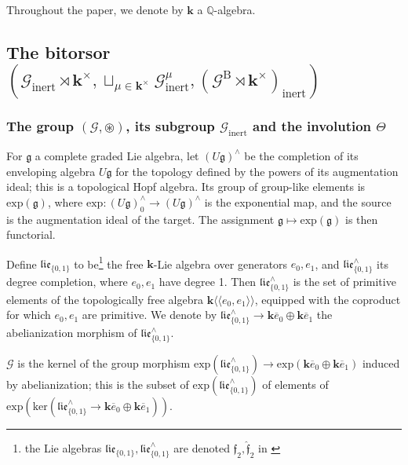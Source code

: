 \documentclass[10pt]{amsart}
\numberwithin{equation}{subsection}
\begin{document}
Throughout the paper, we denote by $\mathbf k$ a $\mathbb Q$-algebra. 

\subsection{The bitorsor $(\mathcal G_{\mathrm{inert}} \rtimes \mathbf k^\times,
\sqcup_{\mu\in\mathbf k^\times}\mathcal G_{\mathrm{inert}}^\mu,
(\mathcal G^{\mathrm B} \rtimes \mathbf k^\times)_{\mathrm{inert}})$}\label{sect:0:2}

\subsubsection{The group $(\mathcal G,\circledast)$, its subgroup 
 $\mathcal G_{\mathrm{inert}}$ and the involution $\Theta$}%

For $\mathfrak g$ a complete graded Lie algebra, let $(U\mathfrak g)^\wedge$ be 
the completion of its enveloping algebra $U\mathfrak g$ for the topology 
defined by the powers of its augmentation ideal; 
this is a topological Hopf algebra. Its group of group-like elements
is $\mathrm{exp}(\mathfrak g)$, where $\mathrm{exp} : (U\mathfrak g)^\wedge_0\to 
(U\mathfrak g)^\wedge$ is the exponential map, and the source is the augmentation ideal of 
the target. The assignment $\mathfrak g\mapsto\mathrm{exp}(\mathfrak g)$ is then functorial. 

Define $\mathfrak{lie}_{\{0,1\}}$ to be\footnote{the Lie algebras $\mathfrak{lie}_{\{0,1\}},
\mathfrak{lie}_{\{0,1\}}^\wedge$ are denoted $\mathfrak f_2,\hat{\mathfrak f}_2$ 
in \cite{EF1}} the free $\mathbf k$-Lie algebra over generators $e_0,e_1$, and 
$\mathfrak{lie}_{\{0,1\}}^\wedge$ its degree completion, where $e_0,e_1$ have 
degree 1. Then $\mathfrak{lie}_{\{0,1\}}^\wedge$ is the set of primitive elements of the 
topologically free algebra $\mathbf k\langle\langle e_0,e_1\rangle\rangle$, 
equipped with the coproduct for which $e_0,e_1$ are primitive. 
We denote by $\mathfrak{lie}_{\{0,1\}}^\wedge\to\mathbf k\overline e_0\oplus
\mathbf k\overline e_1$ the abelianization morphism of $\mathfrak{lie}_{\{0,1\}}^\wedge$. 



\begin{defn}
    $\mathcal G$ is the kernel of the group morphism 
    $\mathrm{exp}(\mathfrak{lie}_{\{0,1\}}^\wedge)\to 
    \mathrm{exp}(\mathbf k\overline e_0\oplus\mathbf k\overline e_1)$ 
    induced by abelianization; this is the subset of 
    $\mathrm{exp}(\mathfrak{lie}_{\{0,1\}}^\wedge)$ of elements of 
    $\mathrm{exp}(\mathrm{ker}(\mathfrak{lie}_{\{0,1\}}^\wedge\to\mathbf k\overline e_0\oplus\mathbf k\overline e_1))$.  
\end{defn}
\end{document}
